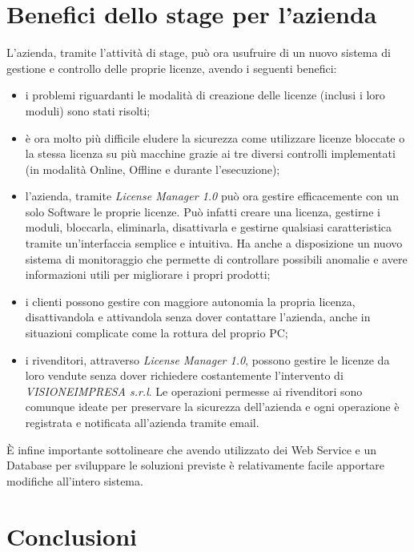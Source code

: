 \section{Benefici dello stage per l'azienda}
L'azienda, tramite l'attività di stage, può ora usufruire di un nuovo sistema di gestione e controllo delle proprie licenze, avendo i seguenti benefici:
\begin{itemize}
\item i problemi riguardanti le modalità di creazione delle licenze (inclusi i loro moduli) sono stati risolti;
\item è ora molto più difficile eludere la sicurezza come utilizzare licenze bloccate o la stessa licenza su più macchine grazie ai tre diversi controlli implementati (in modalità Online, Offline e durante l'esecuzione);
\item l'azienda, tramite \textit{License Manager 1.0} può ora gestire efficacemente con un solo Software le proprie licenze. Può infatti creare una licenza, gestirne i moduli, bloccarla, eliminarla, disattivarla e gestirne qualsiasi caratteristica tramite un'interfaccia semplice e intuitiva. Ha anche a disposizione un nuovo sistema di monitoraggio che permette di controllare possibili anomalie e avere informazioni utili per migliorare i propri prodotti;
\item i clienti possono gestire con maggiore autonomia la propria licenza, disattivandola e attivandola senza dover contattare l'azienda, anche in situazioni complicate come la rottura del proprio PC;
\item i rivenditori, attraverso \textit{License Manager 1.0}, possono gestire le licenze da loro vendute senza dover richiedere costantemente l'intervento di \textit{VISIONEIMPRESA s.r.l}. Le operazioni permesse ai rivenditori sono comunque ideate per preservare la sicurezza dell'azienda e ogni operazione è registrata e notificata all'azienda tramite email.
\end{itemize}

È infine importante sottolineare che avendo utilizzato dei Web Service e un Database per sviluppare le soluzioni previste è relativamente facile apportare modifiche all'intero sistema.

\section{Conclusioni}

